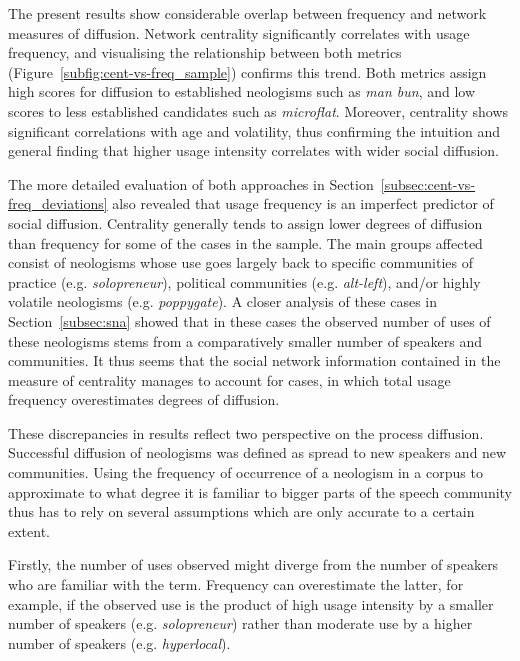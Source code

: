 \documentclass[
  a4paper,
  abstract=on,
  captions=tableabove,
  ]{scrartcl}
\newcommand{\ol}[1]{\emph{#1}}
\begin{document}
    The present results show considerable overlap between frequency and network measures of diffusion. Network centrality significantly correlates with usage frequency, and visualising the relationship between both metrics (Figure~\ref{subfig:cent-vs-freq_sample}) confirms this trend. Both metrics assign high scores for diffusion to established neologisms such as \ol{man bun}, and low scores to less established candidates such as \ol{microflat}. Moreover, centrality shows significant correlations with age and volatility, thus confirming the intuition and general finding that higher usage intensity correlates with wider social diffusion.


    The more detailed evaluation of both approaches in Section~\ref{subsec:cent-vs-freq_deviations} also revealed that usage frequency is an imperfect predictor of social diffusion. Centrality generally tends to assign lower degrees of diffusion than frequency for some of the cases in the sample. The main groups affected consist of neologisms whose use goes largely back to specific communities of practice (e.g. \ol{solopreneur}), political communities (e.g. \ol{alt-left}), and/or highly volatile neologisms (e.g. \ol{poppygate}). A closer analysis of these cases in Section~\ref{subsec:sna} showed that in these cases the observed number of uses of these neologisms stems from a comparatively smaller number of speakers and communities. It thus seems that the social network information contained in the measure of centrality manages to account for cases, in which total usage frequency overestimates degrees of diffusion.

    These discrepancies in results reflect two perspective on the process diffusion. Successful diffusion of neologisms was defined as spread to new speakers and new communities. Using the frequency of occurrence of a neologism in a corpus to approximate to what degree it is familiar to bigger parts of the speech community thus has to rely on several assumptions which are only accurate to a certain extent.

    Firstly, the number of uses observed might diverge from the number of speakers who are familiar with the term. Frequency can overestimate the latter, for example, if the observed use is the product of high usage intensity by a smaller number of speakers (e.g. \ol{solopreneur}) rather than moderate use by a higher number of speakers (e.g. \ol{hyperlocal}).
\end{document}
